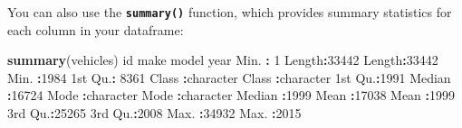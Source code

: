 \documentclass[
]{book}
\newenvironment{Shaded}{\begin{snugshade}}{\end{snugshade}}
\newcommand{\DecValTok}[1]{\textcolor[rgb]{0.00,0.00,0.81}{#1}}
\newcommand{\KeywordTok}[1]{\textcolor[rgb]{0.13,0.29,0.53}{\textbf{#1}}}
\newcommand{\NormalTok}[1]{#1}
\newcommand{\OperatorTok}[1]{\textcolor[rgb]{0.81,0.36,0.00}{\textbf{#1}}}
\newcommand{\StringTok}[1]{\textcolor[rgb]{0.31,0.60,0.02}{#1}}
\begin{document}
\begin{Shaded}
\end{Shaded}

You can also use the \textbf{\texttt{summary()}} function, which provides summary statistics for each column in your dataframe:

\begin{Shaded}
\begin{Highlighting}[]
\KeywordTok{summary}\NormalTok{(vehicles)}
\NormalTok{       id            make              model                year     }
\NormalTok{ Min.   }\OperatorTok{:}\StringTok{    }\DecValTok{1}\NormalTok{   Length}\OperatorTok{:}\DecValTok{33442}\NormalTok{       Length}\OperatorTok{:}\DecValTok{33442}\NormalTok{       Min.   }\OperatorTok{:}\DecValTok{1984}  
\NormalTok{ 1st Qu.}\OperatorTok{:}\StringTok{ }\DecValTok{8361}\NormalTok{   Class }\OperatorTok{:}\NormalTok{character   Class }\OperatorTok{:}\NormalTok{character   1st Qu.}\OperatorTok{:}\DecValTok{1991}  
\NormalTok{ Median }\OperatorTok{:}\DecValTok{16724}\NormalTok{   Mode  }\OperatorTok{:}\NormalTok{character   Mode  }\OperatorTok{:}\NormalTok{character   Median }\OperatorTok{:}\DecValTok{1999}  
\NormalTok{ Mean   }\OperatorTok{:}\DecValTok{17038}\NormalTok{                                         Mean   }\OperatorTok{:}\DecValTok{1999}  
\NormalTok{ 3rd Qu.}\OperatorTok{:}\DecValTok{25265}\NormalTok{                                         3rd Qu.}\OperatorTok{:}\DecValTok{2008}  
\NormalTok{ Max.   }\OperatorTok{:}\DecValTok{34932}\NormalTok{                                         Max.   }\OperatorTok{:}\DecValTok{2015}  
                                                                     

\end{Highlighting}
\end{Shaded}
\end{document}
